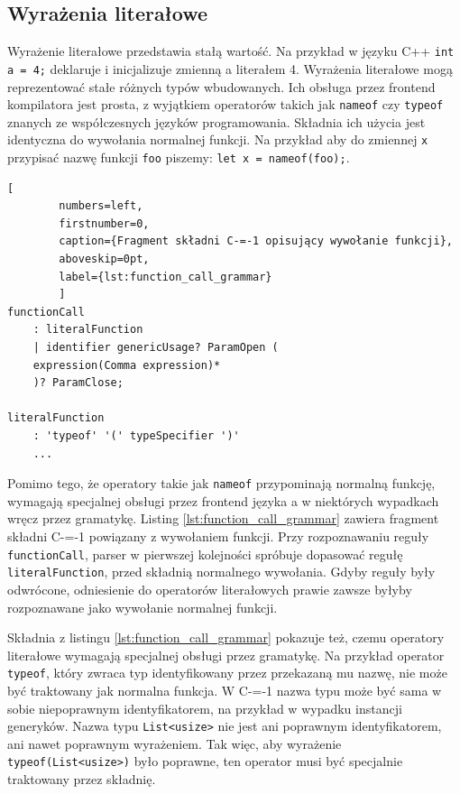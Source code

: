 

\subsection{Wyrażenia literałowe}

Wyrażenie literałowe przedstawia stałą wartość.
Na przykład w języku C++ \lstinline{int a = 4;} deklaruje i inicjalizuje zmienną a literałem 4.
Wyrażenia literałowe mogą reprezentować stałe różnych typów wbudowanych.
Ich obsługa przez frontend kompilatora jest prosta, z wyjątkiem operatorów takich jak \lstinline{nameof} czy \lstinline{typeof} znanych ze współczesnych języków programowania.
Składnia ich użycia jest identyczna do wywołania normalnej funkcji.
Na przykład aby do zmiennej \lstinline{x} przypisać nazwę funkcji \lstinline{foo} piszemy: \lstinline{let x = nameof(foo);}.
\begin{minipage}{\linewidth}
	\begin{lstlisting}[
		numbers=left,
		firstnumber=0,
		caption={Fragment składni C-=-1 opisujący wywołanie funkcji},
		aboveskip=0pt,
		label={lst:function_call_grammar}
		]
functionCall
	: literalFunction
	| identifier genericUsage? ParamOpen (
	expression(Comma expression)*
	)? ParamClose;

literalFunction
	: 'typeof' '(' typeSpecifier ')'
	...
	\end{lstlisting}
\end{minipage}

Pomimo tego, że operatory takie jak \lstinline{nameof} przypominają normalną funkcję, wymagają specjalnej obsługi przez frontend języka a w niektórych wypadkach wręcz przez gramatykę.
Listing \ref{lst:function_call_grammar} zawiera fragment składni C-=-1 powiązany z wywołaniem funkcji.
Przy rozpoznawaniu reguły \lstinline{functionCall}, parser w pierwszej kolejności spróbuje dopasować regułę \lstinline{literalFunction}, przed składnią normalnego wywołania.
Gdyby reguły były odwrócone, odniesienie do operatorów literałowych prawie zawsze byłyby rozpoznawane jako wywołanie normalnej funkcji.

Składnia z listingu \ref{lst:function_call_grammar} pokazuje też, czemu operatory literałowe wymagają specjalnej obsługi przez gramatykę.
Na przykład operator \lstinline{typeof}, który zwraca typ identyfikowany przez przekazaną mu nazwę, nie może być traktowany jak normalna funkcja.
W C-=-1 nazwa typu może być sama w sobie niepoprawnym identyfikatorem, na przykład w wypadku instancji generyków.
Nazwa typu \lstinline{List<usize>} nie jest ani poprawnym identyfikatorem, ani nawet poprawnym wyrażeniem.
Tak więc, aby wyrażenie \lstinline{typeof(List<usize>)} było poprawne, ten operator musi być specjalnie traktowany przez składnię.

